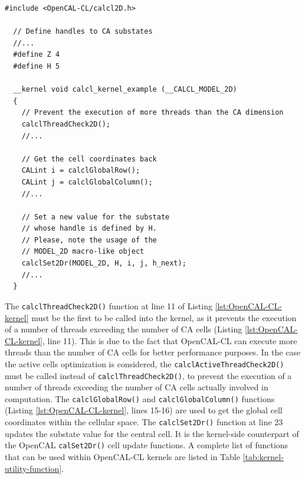 \begin{lstlisting}[float,floatplacement=H, label=lst:OpenCAL-CL-kernel, caption=Example of OpenCAL-CL kernel.]
  #include <OpenCAL-CL/calcl2D.h>

  // Define handles to CA substates
  //...
  #define Z 4
  #define H 5

  __kernel void calcl_kernel_example (__CALCL_MODEL_2D)
  {
    // Prevent the execution of more threads than the CA dimension
    calclThreadCheck2D();
    //...

    // Get the cell coordinates back
    CALint i = calclGlobalRow();
    CALint j = calclGlobalColumn();
    //...

    // Set a new value for the substate
    // whose handle is defined by H.
    // Please, note the usage of the
    // MODEL_2D macro-like object
    calclSet2Dr(MODEL_2D, H, i, j, h_next);
    //...
  }
\end{lstlisting}

The \verb'calclThreadCheck2D()' function at line 11 of Listing
\ref{lst:OpenCAL-CL-kernel} must be the first to be called into the
kernel, as it prevents the execution of a number of threads exceeding
the number of CA cells (Listing \ref{lst:OpenCAL-CL-kernel}, line
11). This is due to the fact that OpenCAL-CL can execute more threads
than the number of CA cells for better performance purposes. In the
case the active cells optimization is considered, the
\verb'calclActiveThreadCheck2D()' must be called instead of
\verb'calclThreadCheck2D()', to prevent the execution of a number of
threads exceeding the number of CA cells actually involved in
computation. The \verb'calclGlobalRow()' and
\verb'calclGlobalColumn()' functions (Listing
\ref{lst:OpenCAL-CL-kernel}, lines 15-16) are used to get the global
cell coordinates within the cellular space. The \verb'calclSet2Dr()'
function at line 23 updates the substate value for the central
cell. It is the kernel-side counterpart of the OpenCAL
\verb'calSet2Dr()' cell update functions. A complete list of functions
that can be used within OpenCAL-CL kernels are listed in Table
\ref{tab:kernel-utility-function}.


